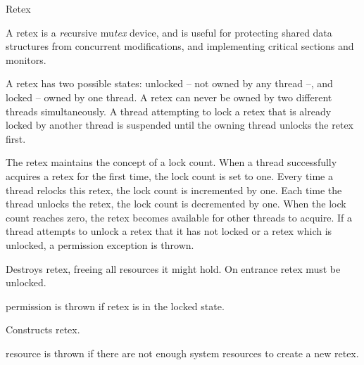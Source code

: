 
\begin{classpage}{Retex}
  
A retex is a {\em re}cursive mu{\em tex} device, and is useful for
protecting shared data structures from concurrent modifications, and
implementing critical sections and monitors.

A retex has two possible states: unlocked -- not owned by any thread
--, and locked -- owned by one thread. A retex can never be owned by
two different threads simultaneously.  A thread attempting to lock a
retex that is already locked by another thread is suspended until the
owning thread unlocks the retex first.

The retex maintains the concept of a lock count. When a thread
successfully acquires a retex for the first time, the lock count is set
to one. Every time a thread relocks this retex, the lock count is
incremented by one. Each time the thread unlocks the retex, the lock
count is decremented by one. When the lock count reaches zero, the
retex becomes available for other threads to acquire. If a thread
attempts to unlock a retex that it has not locked or a retex which is
unlocked, a permission exception is thrown.


\begin{mandescription}
  \destructor
  Destroys  retex, freeing all resources it might
  hold. On entrance  retex must be unlocked.
  \begin{exception}
    \item[permission] is thrown if  retex is in the locked
      state.
  \end{exception}

  \constructor{}
  Constructs  retex.
  \begin{exception}
    \item[resource] is thrown if there are not
      enough system resources to create a new retex.
  \end{exception}


\end{mandescription}
\end{classpage}
